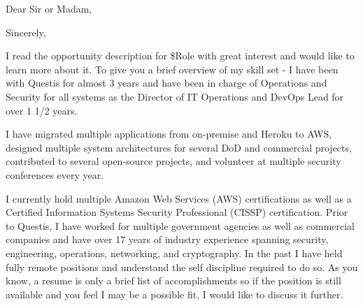 \thispagestyle{empty}
\opening{Dear Sir or Madam,}
\closing{Sincerely,}
\makelettertitle

I read the opportunity description for \$Role with great interest and would like to learn more about it.
To give you a brief overview of my skill set - I have been with Questis for almost 3 years and have been in charge of Operations and Security for all systems as the Director of IT Operations and DevOps Lead for over 1 1/2 years.

I have migrated multiple applications from on-premise and Heroku to AWS, designed multiple system architectures for several DoD and commercial projects, contributed to several open-source projects, and volunteer at multiple security conferences every year. 

I currently hold multiple Amazon Web Services (AWS) certifications as well as a Certified Information Systems Security Professional (CISSP) certification.  Prior to Questis, I have worked for multiple government agencies as well as commercial companies and have over 17 years of industry experience spanning security, engineering, operations, networking, and cryptography.  In the past I have held fully remote positions and understand the self discipline required to do so.
As you know, a resume is only a brief list of accomplishments so if the position is still available and you feel I may be a possible fit, I would like to discuss it further.

\makeletterclosing
\clearpage
\setcounter{page}{1}